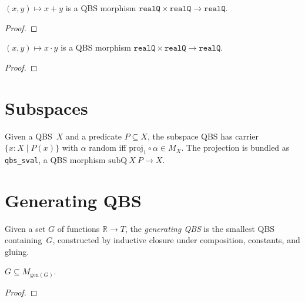\begin{lemma}\label{lem:qbs_morphism_add}
  \rocqok
  $(x, y) \mapsto x + y$ is a QBS morphism
  $\mathtt{realQ} \times \mathtt{realQ} \to \mathtt{realQ}$.
\end{lemma}
\begin{proof}\rocqok\end{proof}

\begin{lemma}\label{lem:qbs_morphism_mul}
  \rocqok
  $(x, y) \mapsto x \cdot y$ is a QBS morphism
  $\mathtt{realQ} \times \mathtt{realQ} \to \mathtt{realQ}$.
\end{lemma}
\begin{proof}\rocqok\end{proof}

\section{Subspaces}\label{sec:subspaces}

\begin{definition}\label{def:sub_qbs}
  \rocqok
  Given a QBS~$X$ and a predicate $P \subseteq X$, the subspace QBS
  has carrier $\{x : X \mid P(x)\}$ with $\alpha$ random iff
  $\mathrm{proj}_1 \circ \alpha \in M_X$. The projection is bundled as
  \texttt{qbs\_sval}, a QBS morphism $\mathrm{subQ}\ X\ P \to X$.
\end{definition}


\section{Generating QBS}\label{sec:generating}

\begin{definition}\label{def:generating_qbs}
  \rocqok
  Given a set $G$ of functions $\mathbb{R} \to T$, the \emph{generating QBS}
  is the smallest QBS containing~$G$, constructed by inductive closure under
  composition, constants, and gluing.
\end{definition}

\begin{lemma}\label{lem:generating_qbs_incl}
  \rocqok
  $G \subseteq M_{\mathrm{gen}(G)}$.
\end{lemma}
\begin{proof}\rocqok\end{proof}

